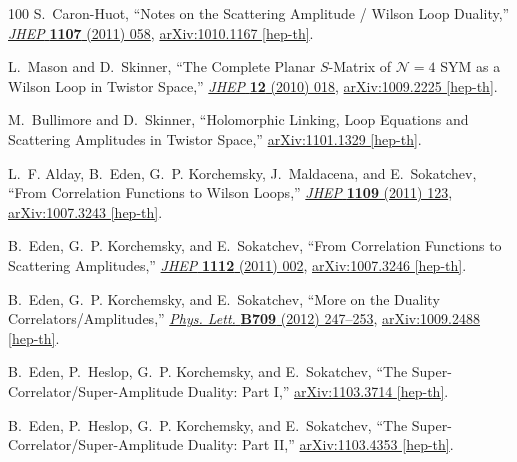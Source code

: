 \documentclass[12pt,hyperref,compress]{JHEP3}
\begin{document}
\begin{thebibliography}{100}
S.~Caron-Huot, ``{Notes on the Scattering Amplitude / Wilson Loop Duality},''
  \href{http://dx.doi.org/10.1007/JHEP07(2011)058}{{\em JHEP} {\bf 1107} (2011)
   058},
\href{http://arxiv.org/abs/1010.1167}{{ arXiv:1010.1167 [hep-th]}}.

L.~Mason and D.~Skinner, ``{The Complete Planar $S$-Matrix of
  $\mathcal{N}\!=\!4$ SYM as a Wilson Loop in Twistor Space},''
  \href{http://dx.doi.org/10.1007/JHEP12(2010)018}{{\em JHEP} {\bf 12} (2010)
  018},
\href{http://arxiv.org/abs/1009.2225}{{ arXiv:1009.2225 [hep-th]}}.

M.~Bullimore and D.~Skinner, ``{Holomorphic Linking, Loop Equations and
  Scattering Amplitudes in Twistor Space},''
\href{http://arxiv.org/abs/1101.1329}{{ arXiv:1101.1329 [hep-th]}}.

L.~F. Alday, B.~Eden, G.~P. Korchemsky, J.~Maldacena, and E.~Sokatchev, ``{From
  Correlation Functions to Wilson Loops},''
  \href{http://dx.doi.org/10.1007/JHEP09(2011)123}{{\em JHEP} {\bf 1109} (2011)
   123},
\href{http://arxiv.org/abs/1007.3243}{{ arXiv:1007.3243 [hep-th]}}.

B.~Eden, G.~P. Korchemsky, and E.~Sokatchev, ``{From Correlation Functions to
  Scattering Amplitudes},''
  \href{http://dx.doi.org/10.1007/JHEP12(2011)002}{{\em JHEP} {\bf 1112} (2011)
   002},
\href{http://arxiv.org/abs/1007.3246}{{ arXiv:1007.3246 [hep-th]}}.

B.~Eden, G.~P. Korchemsky, and E.~Sokatchev, ``{More on the Duality
  Correlators/Amplitudes},''
  \href{http://dx.doi.org/10.1016/j.physletb.2012.02.014}{{\em Phys. Lett.}
  {\bf B709} (2012)  247--253},
\href{http://arxiv.org/abs/1009.2488}{{ arXiv:1009.2488 [hep-th]}}.

B.~Eden, P.~Heslop, G.~P. Korchemsky, and E.~Sokatchev, ``{The
  Super-Correlator/Super-Amplitude Duality: Part I},''
\href{http://arxiv.org/abs/1103.3714}{{ arXiv:1103.3714 [hep-th]}}.

B.~Eden, P.~Heslop, G.~P. Korchemsky, and E.~Sokatchev, ``{The
  Super-Correlator/Super-Amplitude Duality: Part II},''
\href{http://arxiv.org/abs/1103.4353}{{ arXiv:1103.4353 [hep-th]}}.


\end{thebibliography}
\end{document}
